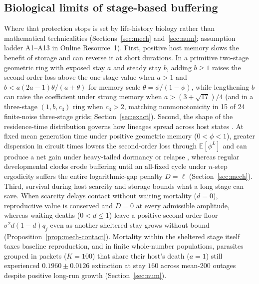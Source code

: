 \subsection{Biological limits of stage-based buffering}\label{subsec:disc-limits}

Where that protection stops is set by life-history biology rather than mathematical technicalities (Sections~\ref{sec:mech} and~\ref{sec:num}; assumption ladder A1--A13 in Online Resource~1). First, positive host memory slows the benefit of storage and can reverse it at short durations. In a primitive two-stage geometric ring with exposed stay $a$ and steady stay $b$, adding $b \ge 1$ raises the second-order loss above the one-stage value when $a > 1$ and $b < a(2a - 1)\theta/(a + \theta)$ for memory scale $\theta = \phi/(1 - \phi)$, while lengthening $b$ can raise the coefficient under strong memory when $a > (3 + \sqrt{17})/4$ (and in a three-stage $(1, b, c_3)$ ring when $c_3 > 2$, matching nonmonotonicity in 15 of 24 finite-noise three-stage grids; Section~\ref{sec:exact}). Second, the shape of the residence-time distribution governs how lineages spread across host states \citep{tuljapurkar1990,lloyd2001}. At fixed mean generation time under positive geometric memory ($0 < \phi < 1$), greater dispersion in circuit times lowers the second-order loss through $\mathbb{E}[\phi^L]$ and can produce a net gain under heavy-tailed dormancy or relapse \citep{white2016}, whereas regular developmental clocks erode buffering until an all-fixed cycle under $n$-step ergodicity suffers the entire logarithmic-gap penalty $D = \ell$ (Section~\ref{sec:mech}). Third, survival during host scarcity and storage bounds what a long stage can save. When scarcity delays contact without waiting mortality ($d = 0$), reproductive value is conserved and $D = 0$ at every admissible amplitude, whereas waiting deaths ($0 < d \le 1$) leave a positive second-order floor $\sigma^2 d(1 - d)q_j$ even as another sheltered stay grows without bound (Proposition~\ref{prop:mech-contact}). Mortality within the sheltered stage itself taxes baseline reproduction, and in finite whole-number populations, parasites grouped in packets ($K = 100$) that share their host's death ($a = 1$) still experienced $0.1960 \pm 0.0126$ extinction at stay $160$ across mean-$200$ outages despite positive long-run growth (Section~\ref{sec:num}).

